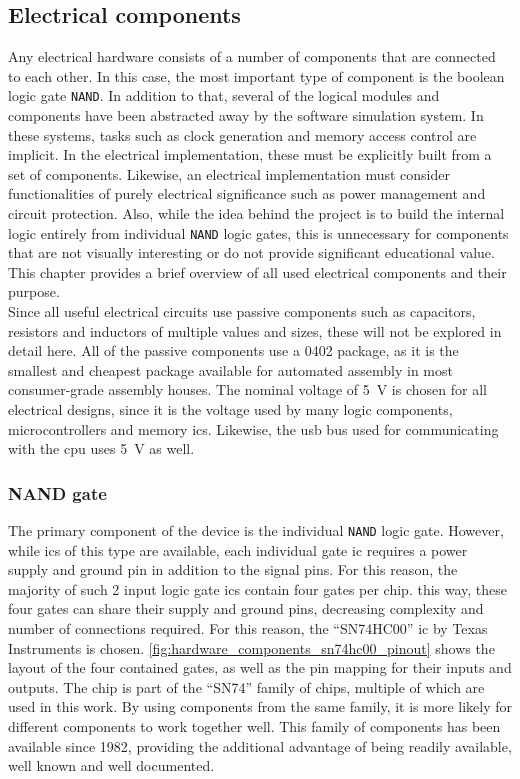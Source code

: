 \subsection{Electrical components}

Any electrical hardware consists of a number of components that are connected to each other. In this case, the most important type of component is the boolean logic gate \texttt{NAND}. In addition to that, several of the logical modules and components have been abstracted away by the software simulation system. In these systems, tasks such as clock generation and memory access control are implicit. In the electrical implementation, these must be explicitly built from a set of components. Likewise, an electrical implementation must consider functionalities of purely electrical significance such as power management and circuit protection. Also, while the idea behind the project is to build the internal logic entirely from individual \texttt{NAND} logic gates, this is unnecessary for components that are not visually interesting or do not provide significant educational value. This chapter provides a brief overview of all used electrical components and their purpose. 
\\

Since all useful electrical circuits use passive components such as capacitors, resistors and inductors of multiple values and sizes, these will not be explored in detail here. All of the passive components use a 0402 package, as it is the smallest and cheapest package available for automated assembly in most consumer-grade assembly houses. The nominal voltage of \SI{5}{\volt} is chosen for all electrical designs, since it is the voltage used by many logic components, microcontrollers and memory \acp{ic}. Likewise, the \ac{usb} bus used for communicating with the \ac{cpu} uses \SI{5}{\volt} as well.

\subsubsection*{NAND gate}

The primary component of the device is the individual \texttt{NAND} logic gate. However, while \acp{ic} of this type are available, each individual gate \ac{ic} requires a power supply and ground pin in addition to the signal pins. For this reason, the majority of such 2 input logic gate \acp{ic} contain four gates per chip. this way, these four gates can share their supply and ground pins, decreasing complexity and number of connections required. For this reason, the ``SN74HC00'' \ac{ic} by Texas Instruments is chosen. \autoref{fig:hardware_components_sn74hc00_pinout} shows the layout of the four contained gates, as well as the pin mapping for their inputs and outputs. The chip is part of the ``SN74'' family of chips, multiple of which are used in this work. By using components from the same family, it is more likely for different components to work together well. This family of components has been available since 1982, providing the additional advantage of being readily available, well known and well documented. 

